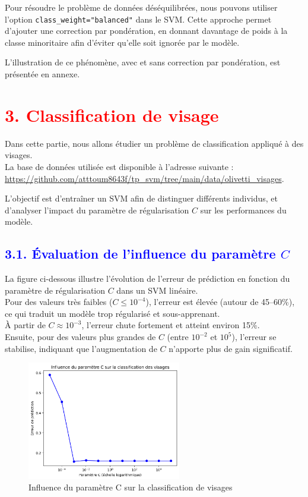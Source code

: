 \documentclass[
  12pt,
]{article}
\begin{document}
Pour résoudre le problème de données déséquilibrées, nous pouvons
utiliser l'option \texttt{class\_weight="balanced"} dans le SVM. Cette
approche permet d'ajouter une correction par pondération, en donnant
davantage de poids à la classe minoritaire afin d'éviter qu'elle soit
ignorée par le modèle.

L'illustration de ce phénomène, avec et sans correction par pondération,
est présentée en annexe.

\section{\texorpdfstring{\textcolor{red}{3. Classification de visage}}{}}\label{section-5}

Dans cette partie, nous allons étudier un problème de classification
appliqué à des visages.\\
La base de données utilisée est disponible à l'adresse suivante :\\
\textcolor{blue}{\url{https://github.com/atttoum8643f/tp_svm/tree/main/data/olivetti_visages}}.

L'objectif est d'entraîner un SVM afin de distinguer différents
individus, et d'analyser l'impact du paramètre de régularisation \(C\)
sur les performances du modèle.

\subsection{\texorpdfstring{\textcolor{blue}{3.1. Évaluation de l’influence du paramètre $C$}}{}}\label{section-6}

La figure ci-dessous illustre l'évolution de l'erreur de prédiction en
fonction du paramètre de régularisation \(C\) dans un SVM linéaire.\\
Pour des valeurs très faibles (\(C \leq 10^{-4}\)), l'erreur est élevée
(autour de 45--60\%), ce qui traduit un modèle trop régularisé et
sous-apprenant.\\
À partir de \(C \approx 10^{-3}\), l'erreur chute fortement et atteint
environ 15\%.\\
Ensuite, pour des valeurs plus grandes de \(C\) (entre \(10^{-2}\) et
\(10^{5}\)), l'erreur se stabilise, indiquant que l'augmentation de
\(C\) n'apporte plus de gain significatif.

\begin{figure}[H]
    \centering
    \includegraphics[width=0.6\textwidth]{vis/influence_c.png}
    \caption{Influence du paramètre C sur la classification de visages}
    \label{fig:influence_de_c}
\end{figure}
\end{document}
